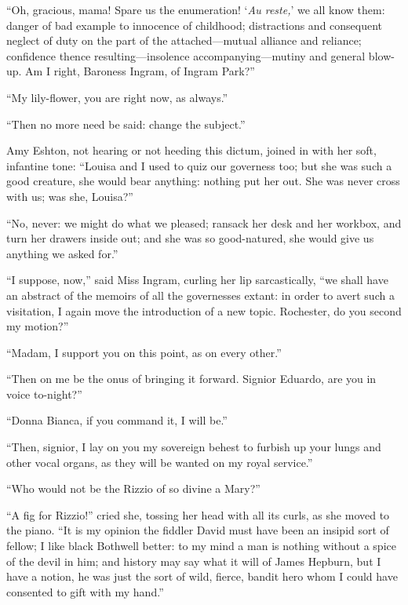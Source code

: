 \enquote{Oh, gracious, mama! Spare us the enumeration! \foreignquote{french}{\emph{Au reste,}} we %
all know them: danger of bad example to innocence of childhood;
distractions and consequent neglect of duty on the part of the
attached---mutual alliance and reliance; confidence thence
resulting---insolence accompanying---mutiny and general blow-up. Am I
right, Baroness Ingram, of Ingram Park?}

\enquote{My lily-flower, you are right now, as always.}

\enquote{Then no more need be said: change the subject.}

Amy Eshton, not hearing or not heeding this dictum, joined in with her
soft, infantine tone: \enquote{Louisa and I used to quiz our governess
too; but she was such a good creature, she would bear anything: nothing
put her out. She was never cross with us; was she, Louisa?}

\enquote{No, never: we might do what we pleased; ransack her desk and
her workbox, and turn her drawers inside out; and she was so
good-natured, she would give us anything we asked for.}

\enquote{I suppose, now,} said Miss Ingram, curling her lip
sarcastically, \enquote{we shall have an abstract of the memoirs of all
the governesses extant: in order to avert such a visitation, I again
move the introduction of a new topic. \Mr{} Rochester, do you second my
motion?}

\enquote{Madam, I support you on this point, as on every other.}

\enquote{Then on me be the onus of bringing it forward. Signior
Eduardo, are you in voice to-night?}

\enquote{Donna Bianca, if you command it, I will be.}

\enquote{Then, signior, I lay on you my sovereign behest to furbish up
your lungs and other vocal organs, as they will be wanted on my royal
service.}

\enquote{Who would not be the Rizzio of so divine a Mary?}

\enquote{A fig for Rizzio!} cried she, tossing her head with all its
curls, as she moved to the piano. \enquote{It is my opinion the fiddler
David must have been an insipid sort of fellow; I like black Bothwell
better: to my mind a man is nothing without a spice of the devil in him;
and history may say what it will of James Hepburn, but I have a notion,
he was just the sort of wild, fierce, bandit hero whom I could have
consented to gift with my hand.}

